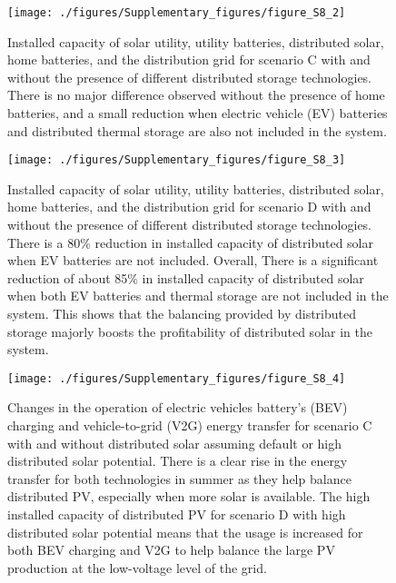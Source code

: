 \begin{figure}[H]
\renewcommand*{\thefigure}{S\arabic{figure}}

\texttt{[image: ./figures/Supplementary\_figures/figure\_S8\_2]}
\caption{Installed capacity of solar utility, utility batteries, distributed solar, home batteries, and the distribution grid for scenario C with and without the presence of different distributed storage technologies. There is no major difference observed without the presence of home batteries, and a small reduction when electric vehicle (EV) batteries and distributed thermal storage are also not included in the system. }
\end{figure}

\begin{figure}[H]
\renewcommand*{\thefigure}{S\arabic{figure}}

\texttt{[image: ./figures/Supplementary\_figures/figure\_S8\_3]}
\caption{Installed capacity of solar utility, utility batteries, distributed solar, home batteries, and the distribution grid for scenario D with and without the presence of different distributed storage technologies. There is a 80\% reduction in installed capacity of distributed solar when EV batteries are not included. Overall, There is a significant reduction of about 85\% in installed capacity of distributed solar when both EV batteries and thermal storage are not included in the system. This shows that the balancing provided by distributed storage majorly boosts the profitability of distributed solar in the system.}
\end{figure}

\begin{figure}[H]
\renewcommand*{\thefigure}{S\arabic{figure}}

\texttt{[image: ./figures/Supplementary\_figures/figure\_S8\_4]}
\caption{Changes in the operation of electric vehicles battery's (BEV) charging and vehicle-to-grid (V2G) energy transfer for scenario C with and without distributed solar assuming default or high distributed solar potential. There is a clear rise in the energy transfer for both technologies in summer as they help balance distributed PV, especially when more solar is available. The high installed capacity of distributed PV for scenario D with high distributed solar potential means that the usage is increased for both BEV charging and V2G to help balance the large PV production at the low-voltage level of the grid. }
\end{figure}


